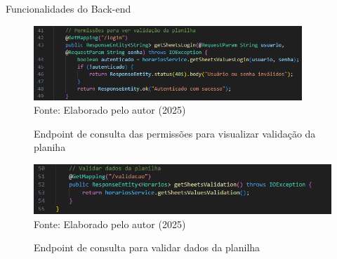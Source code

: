 \begin{frame}{Funcionalidades do Back-end}
    \begin{figure}
        \centering
        \vspace{-0.3cm}
        \caption{Endpoint de consulta das permissões para visualizar validação da planiha}
        \vspace{-0.2cm}
        \includegraphics[width=0.9\textwidth]{figuras/back-7.png}
        \\ %
        \footnotesize Fonte: Elaborado pelo autor (2025)
    \end{figure}
    \begin{figure}
        \centering
        \vspace{-0.5cm}
        \caption{Endpoint de consulta para validar dados da planilha}
        \vspace{-0.2cm}
        \includegraphics[width=1\textwidth]{figuras/back-8.png}
        \\ %
        \footnotesize Fonte: Elaborado pelo autor (2025)
    \end{figure}
\end{frame}

